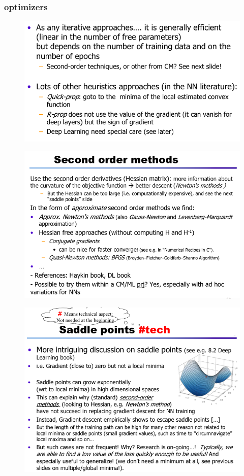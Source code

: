 \documentclass[../main.tex]{subfiles}
\begin{document}
\subsubsection{optimizers}
\begin{figure}[H]
    \centering
    \includegraphics[scale = 0.40]{lectures/4_neural_networks/4_optimizers_1.png}
\end{figure}
\begin{figure}[H]
    \centering
    \includegraphics[scale = 0.40]{lectures/4_neural_networks/4_optimizers_2.png}
\end{figure}
\begin{figure}[H]
    \centering
    \includegraphics[scale = 0.40]{lectures/4_neural_networks/4_optimizers_3.png}
\end{figure}
\end{document}
